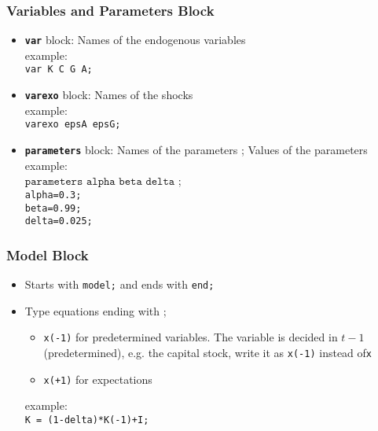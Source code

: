 \documentclass[xcolor=dvipsnames,handout,aspectratio=169]{beamer}
\begin{document}
\begin{frame}[t]\frametitle{\textbf{Variables and Parameters Block}}
  \begin{itemize}
     \setlength\itemsep{2em}
    \item \texttt{\textbf{var}} block: Names of the endogenous variables \\
    example: \\ \texttt{var K  C  G  A;}
    \item \texttt{\textbf{varexo}} block: Names of the shocks \\
    example: \\ \texttt{varexo epsA  epsG;}
    \item \texttt{\textbf{parameters}} block: Names of the parameters ; Values of the parameters
    \\
    example: \\ $\texttt{parameters alpha  beta  delta }$; \\
    \texttt{alpha=0.3;} \\
    \texttt{beta=0.99;} \\
    \texttt{delta=0.025;} \\
  \end{itemize}

\end{frame}

\begin{frame}[t]\frametitle{\textbf{Model Block}}
  \begin{itemize}
     \setlength\itemsep{2em}
    \item Starts with \texttt{model;} and ends with \texttt{end;}
    \item Type equations ending with ;
    \begin{itemize}
      \item  \texttt{x(-1)} for predetermined variables. The variable is decided in $t-1$ (predetermined), e.g. the capital stock, write it as \texttt{x(-1)} instead of\texttt{x}
      \item  \texttt{x(+1)} for expectations
    \end{itemize}
    example:  \\ \texttt{K = (1-delta)*K(-1)+I;}
  \end{itemize}
\end{frame}
\end{document}
